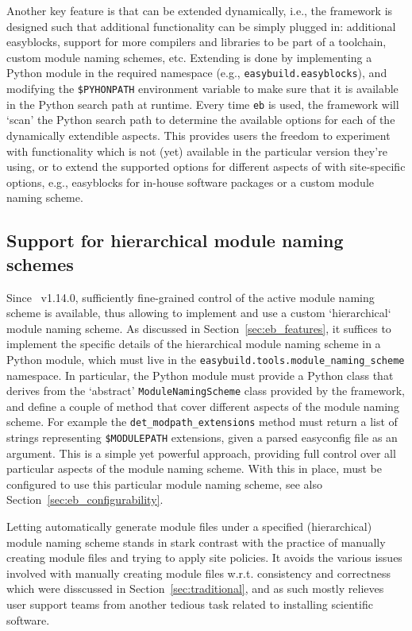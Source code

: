 Another key feature is that \easybuild{} can be extended dynamically, i.e., the
framework is designed such that additional functionality can be simply plugged in:
additional easyblocks, support for more compilers and libraries to be part
of a toolchain, custom module naming schemes, etc. Extending \easybuild{} is done by
implementing a Python module in the required namespace (e.g.,
\texttt{easybuild.easyblocks}), and modifying the \texttt{\$PYHONPATH} environment
variable to make sure that it is available in the Python search path at runtime.
Every time \texttt{eb} is used, the framework will `scan' the Python search path to
determine the available options for each of the dynamically extendible aspects.
This provides \easybuild{} users the freedom to experiment with functionality which
is not (yet) available in the particular version they're using, or to extend
the supported options for different aspects of \easybuild{} with site-specific
options, e.g., easyblocks for in-house software packages or a custom module naming
scheme.

\subsection{Support for hierarchical module naming schemes}

Since \easybuild{}~v1.14.0, sufficiently fine-grained control of the active module
naming scheme is available, thus allowing to implement and use a custom `hierarchical`
module naming scheme. As discussed in Section~\ref{sec:eb_features}, it suffices to
implement the specific details of the hierarchical module naming scheme in a Python
module, which must live in the \texttt{easybuild.tools.module\_naming\_scheme}
namespace. In particular, the Python module must provide a Python class that derives
from the `abstract' \texttt{ModuleNamingScheme} class provided by the \easybuild{}
framework, and define a couple of method that cover different aspects of the
module naming scheme. For example the \texttt{det\_modpath\_extensions} method must
return a list of strings representing \texttt{\$MODULEPATH} extensions, given a
parsed easyconfig file as an argument. This is a simple yet powerful approach,
providing full control over all particular aspects of the module naming scheme.
With this in place, \easybuild{} must be configured to use this particular module
naming scheme, see also Section~\ref{sec:eb_configurability}.

Letting \easybuild{} automatically generate module files under a specified
(hierarchical) module naming scheme stands in stark contrast with the practice of
manually creating module files and trying to apply site policies. It avoids the
various issues involved with manually creating module files w.r.t. consistency and
correctness which were disscussed in Section~\ref{sec:traditional}, and as such mostly
relieves user support teams from another tedious task related to installing
scientific software.
